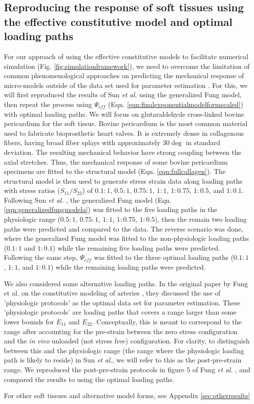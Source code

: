 \subsection{Reproducing the response of soft tissues using the effective constitutive model and optimal loading paths}\label{sec:reproducefung}

	For our approach of using the effective constitutive models to facilitate numerical simulation (Fig. \ref{fig:simulationframework}), we need to overcome the limitation of common phenomenological approaches on predicting the mechanical response of micro-models outside of the data set used for parameter estimation \cite{sun_biaxial_2003}. For this, we will first reproduced the results of Sun \textit{et al.} \cite{sun_biaxial_2003} using the generalized Fung model, then repeat the process using $\Psi_{eff}$ (Eqn. \ref{eqn:finalexponentialmodelformscaled}) with optimal loading paths. We will focus on glutaraldehyde cross-linked bovine pericardium for the soft tissue. Bovine pericardium is the most common material used to fabricate bioprosthetic heart valves. It is extremely dense in collagenous fibers, having broad fiber splays with approximately $30\deg$ in standard deviation. The resulting mechanical behavior have strong coupling between the axial stretches. Thus, the mechanical response of some bovine pericardium specimens are fitted to the structural model (Eqn. \ref{eqn:fullcollagen}). The structural model is then used to generate stress strain data along loading paths with stress ratios ($S_{11}/S_{22}$) of $0.1:1$, $0.5:1$, $0.75:1$, $1:1$, $1:0.75$, $1:0.5$, and $1:0.1$. Following Sun \textit{et al.} \cite{sun_biaxial_2003}, the generalized Fung model (Eqn. \ref{eqn:generalizedfungmodela}) was fitted to the five loading paths in the physiologic range ($0.5:1$, $0.75:1$, $1:1$, $1:0.75$, $1:0.5$), then the remain two loading paths were predicted and compared to the data. The reverse scenario was done, where the generalized Fung model was fitted to the non-physiologic loading paths ($0.1:1$ and $1:0.1$) while the remaining five loading paths were predicted. Following the same step, $\Psi_{eff}$ was fitted to the three optimal loading paths ($0.1:1$, $1:1$, and $1:0.1$) while the remaining loading paths were predicted. 
    
    We also considered some alternative loading paths. In the original paper by Fung et al. on the constitutive modeling of arteries \cite{fung_pseudoelasticity_1979}, they discussed the use of 'physiologic protocols' as the optimal data set for parameter estimation. These 'physiologic protocols' are loading paths that covers a range larger than some lower bounds for $E_{11}$ and $E_{22}$. Conceptually, this is meant to correspond to the range after accounting for the pre-strain between the zero stress configuration and the \textit{in vivo} unloaded (not stress free) configuration. For clarity, to distinguish between this and the physiologic range (the range where the physiologic loading path is likely to reside) in Sun \textit{et al.}, we will refer to this as the post-pre-strain range. We reproduced the post-pre-strain protocols in figure 5 of Fung \textit{et al.} \cite{fung_pseudoelasticity_1979}, and compared the results to using the optimal loading paths. 
    
	For other soft tissues and alternative model forms, see Appendix \ref{sec:otherresults}






